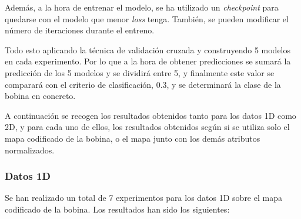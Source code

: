 Además, a la hora de entrenar el modelo, se ha utilizado un \emph{checkpoint} para quedarse con el modelo que menor \emph{loss} tenga. También, se pueden modificar el número de iteraciones durante el entreno.

Todo esto aplicando la técnica de validación cruzada y construyendo 5 modelos en cada experimento. Por lo que a la hora de obtener predicciones se sumará la predicción de los 5 modelos y se dividirá entre 5, y finalmente este valor se comparará con el criterio de clasificación, 0.3, y se determinará la clase de la bobina en concreto.

A continuación se recogen los resultados obtenidos tanto para los datos 1D como 2D, y para cada uno de ellos, los resultados obtenidos según si se utiliza solo el mapa codificado de la bobina, o el mapa junto con los demás atributos normalizados.

\subsubsection{Datos 1D}
Se han realizado un total de 7 experimentos para los datos 1D sobre el mapa codificado de la bobina. Los resultados han sido los siguientes:

